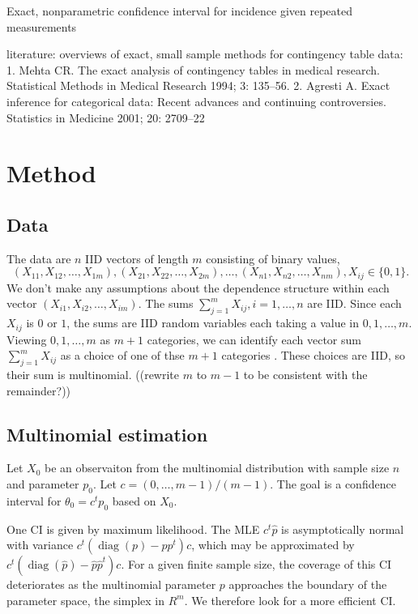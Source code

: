 \documentclass{article}
\newcommand{\x}X
\newcommand{\p}p
\newcommand{\n}n
\newcommand{\m}m
\renewcommand{\c}c
\DeclareMathOperator{\diag}{diag}
\begin{document}
Exact, nonparametric confidence interval for incidence given repeated measurements


literature:
overviews of exact, small sample methods for contingency table data:
1. Mehta CR. The exact analysis of contingency
tables in medical research. Statistical Methods
in Medical Research 1994; 3: 135–56.
2. Agresti A. Exact inference for categorical data: Recent advances and continuing controversies.
Statistics in Medicine 2001; 20: 2709–22

\section{Method}

\subsection{Data}
The data are $n$ IID vectors of length
$m$ consisting of binary values, 
$$
(\x_{11},\x_{12},\ldots,\x_{1m}), (\x_{21},\x_{22},\ldots,\x_{2m}), \ldots,
(\x_{n1},\x_{n2},\ldots,\x_{nm}), \x_{ij}\in\{0,1\}.
$$ We don't make any assumptions about
the dependence structure within each vector
$(\x_{i1},\x_{i2},\ldots,\x_{im})$. The sums
$\sum_{j=1}^m\x_{ij}, i=1,\ldots,n$ are IID. Since each $\x_{ij}$ is
$0$ or $1$, the sums are IID random variables each taking a value in
$0,1,\ldots,m$. Viewing $0,1,\ldots,m$ as $m+1$ categories, we can
identify each vector sum $\sum_{j=1}^m\x_{ij}$ as a choice of
one of thse $m+1$ categories%
. These choices
are IID, so their sum is multinomial. ((rewrite $m$ to $m-1$ to be
consistent with the remainder?))

\subsection{Multinomial estimation}

Let $\x_0$ be an observaiton from the multinomial distribution with
sample size $\n$ and parameter $\p_0%
$. Let
$\c=(0,\ldots,\m-1)/(\m-1)$. The goal is a confidence interval for
$\theta_0=\c^t\p_0$ based on $\x_0$.

One CI is given by maximum likelihood. The MLE $\c^t\hat\p$ is asymptotically
normal with variance $\c^t(\diag(\p)-\p\p^t)\c$, which may be approximated by $\c^t(\diag(\hat\p)-\hat\p\hat\p^t)\c$. For a
given finite sample size, the coverage of this CI deteriorates as the
multinomial parameter $\p$ approaches the boundary of the parameter
space, the simplex in $R^m$. We therefore look for a more efficient
CI.
\end{document}
